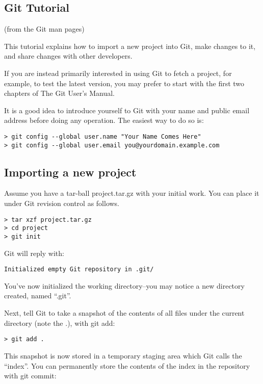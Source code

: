 \documentclass[justified,sixbynine]{tufte-book}
\theoremstyle{plain}%
\theoremstyle{definition}
\theoremstyle{remark}
\begin{document}
\begin{fullwidth}
\section{Git Tutorial}

(from the Git man pages)

This tutorial explains how to import a new project into Git, make changes to it, and share changes with other developers.

If you are instead primarily interested in using Git to fetch a project, for example, to test the latest version, you may prefer to start with the first two chapters of The Git User's Manual.

It is a good idea to introduce yourself to Git with your name and public email address before doing any operation. The easiest way to do so is:

\begin{lstlisting}
> git config --global user.name "Your Name Comes Here"
> git config --global user.email you@yourdomain.example.com
\end{lstlisting}

\subsection{Importing a new project}

Assume you have a tar-ball project.tar.gz with your initial work. You can place it under Git revision control as follows.

\begin{lstlisting}
> tar xzf project.tar.gz
> cd project
> git init
\end{lstlisting}

Git will reply with:

\begin{lstlisting}
Initialized empty Git repository in .git/
\end{lstlisting}

You've now initialized the working directory--you may notice a new directory created, named ``.git''.

Next, tell Git to take a snapshot of the contents of all files under the current directory (note the .), with git add:

\begin{lstlisting}
> git add .
\end{lstlisting}

This snapshot is now stored in a temporary staging area which Git calls the ``index''. You can permanently store the contents of the index in the repository with git commit:


\end{fullwidth}
\end{document}
